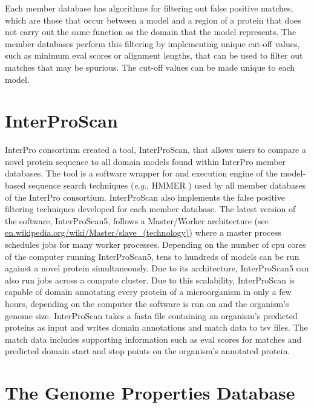 Each member database has algorithms for filtering out false positive matches, 
which are those that occur between a model and a region of a protein that does 
not carry out the same function as the domain that the model represents. The 
member databases perform this filtering by implementing unique cut-off values, 
such as minimum \gls{eval} scores or alignment lengths, that can be used to 
filter out matches that may be spurious. The cut-off values can be made unique 
to each model. 

\section{InterProScan} \label{overview-interproscan}

InterPro consortium created a tool, InterProScan, that allows users to compare a 
novel protein sequence to all domain models found within InterPro member 
databases. The tool is a software wrapper for and execution engine of the 
model-based sequence search techniques (\textit{e}.\textit{g}., HMMER 
\cite{eddy2011accelerated}) used by all member databases of the InterPro 
consortium. InterProScan also implements the false positive filtering techniques 
developed for each member database. The latest version of the software, 
InterProScan5, follows a Master/Worker architecture (see 
\href{http://en.wikipedia.org/wiki/Master/slave_(technology)}{en.wikipedia.org/wiki/Master/slave\_(technology)}) 
where a master process schedules jobs for many worker processes. Depending on 
the number of \gls{cpu} cores of the computer running InterProScan5, tens to 
hundreds of models can be run against a novel protein simultaneously. Due to its 
architecture, InterProScan5 can also run jobs across a compute cluster. Due 
to this scalability, InterProScan is capable of domain annotating every protein 
of a microorganism in only a few hours, depending on the computer the software 
is run on and the organism's genome size. InterProScan takes a \gls{fasta} file 
\cite{pearson19905} containing an organism's predicted proteins as input and 
writes domain annotations and match data to \gls{tsv} files. The match data 
includes supporting information such as \gls{eval} scores for matches and 
predicted domain start and stop points on the organism's annotated protein.

\section{The Genome Properties Database} \label{genome-properties-overview}

